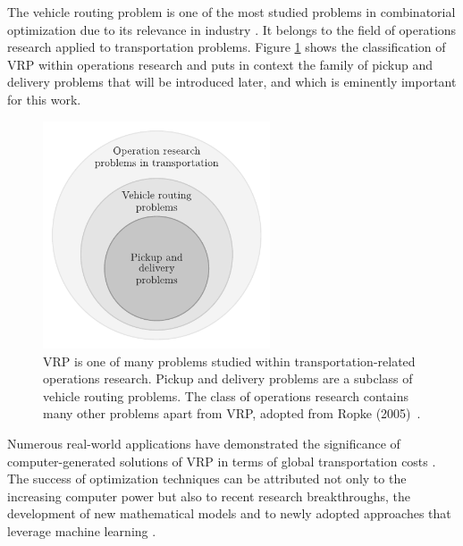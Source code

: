 
The vehicle routing problem is one of the most studied problems in combinatorial optimization due to its relevance in industry \cite{golden2008the}. It belongs to the field of operations research applied to transportation problems. Figure \ref{fig:vrp-classes} shows the classification of VRP within operations research and puts in context the family of pickup and delivery problems that will be introduced later, and which is eminently important for this work.

	\begin{figure}[!ht]
		\centering
		\includegraphics[width=0.6\textwidth]{figures/vrp-classes.pdf}
		\caption[The taxonomy of VRP and PDP within transportation-related operations research.]{VRP is one of many problems studied within transportation-related operations research. Pickup and delivery problems are a subclass of vehicle routing problems. The class of operations research contains many other problems apart from VRP, adopted from Ropke (2005)~\cite[p.~4~(modified)]{ropke-2005-phd}.}
		\label{fig:vrp-classes}
	\end{figure}

Numerous real-world applications have demonstrated the significance of computer-generated solutions of VRP in terms of global transportation costs \cite{toth2015vrp}. The success of optimization techniques can be attributed not only to the increasing computer power but also to recent research breakthroughs, the development of new mathematical models and to newly adopted approaches that leverage machine learning \cite{toth2015vrp, Falkner2020}. 

